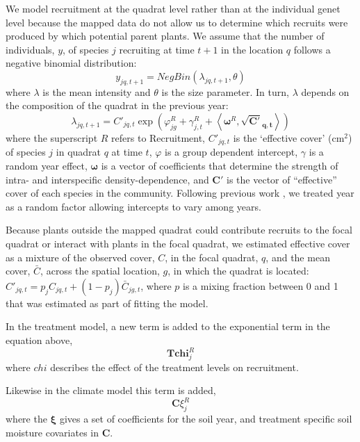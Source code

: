 \documentclass[11pt]{article}
\begin{document}
\begin{doublespacing}
We model recruitment at the quadrat level rather than at the individual genet level because the mapped data do not allow us to determine which recruits were produced by which potential parent plants. We assume that the number of individuals, $y$, of species $j$ recruiting at time $t+1$ in the location $q$ follows a negative binomial distribution:
\begin{equation}
y_{jq,t+1}= NegBin(\lambda_{jq,t+1},\theta) 	   
\label{eqn:recrDataModel}
\end{equation}
where $\lambda$ is the mean intensity and $\theta$ is the size parameter. In turn, $\lambda$ depends on the composition of the quadrat in the previous year:
\begin{equation}
\lambda_{jq,t+1} = C'_{jq,t} \exp{\left(\varphi_{jg}^R + \gamma_{j,t}^R + 
\left \langle \boldsymbol{\omega}^R , \boldsymbol{\sqrt{C'}_{q,t}} \right \rangle \right) }
\label{eqn:recrProcessModel}
\end{equation}
where the superscript $R$ refers to Recruitment, $C'_{jq,t}$ is the `effective cover' (cm$^2$) of species $j$ in quadrat $q$ at time $t$, $\varphi$ is a group dependent intercept, $\gamma$ is a random year effect, $\boldsymbol{\omega}$ is a vector of coefficients that determine the strength of intra- and interspecific density-dependence, and $\boldsymbol{C'}$ is the vector of ``effective'' cover of each species in the community. Following previous work \citep{adler_coexistence_2010}, we treated year as a random factor allowing intercepts to vary among years. 
   
Because plants outside the mapped quadrat could contribute recruits to the focal quadrat or interact with plants in the focal quadrat, we estimated effective cover as a mixture of the observed cover, $C$, in the focal quadrat, $q$, and the mean cover, $\bar{C}$, across the spatial location, $g$, in which the quadrat is located: $C'_{jq,t}=p_j C_{jq,t}+(1-p_j) \bar{C}_{jg,t}$, where $p$ is a mixing fraction between 0 and 1 that was estimated as part of fitting the model.

In the treatment model, a new term is added to the exponential term in the equation above, 
\begin{equation}
 \boldsymbol{T}\boldsymbol{chi}_{j}^R
\end{equation}
where $chi$ describes the effect of the treatment levels on recruitment.

Likewise in the climate model this term is added,
\begin{equation}
\boldsymbol{C}\xi_{j}^R 
\label{eqn:recC}
\end{equation}
where the $\boldsymbol{\xi}$ gives a set of coefficients for the soil year, and treatment specific soil moisture covariates in $\boldsymbol{C}$.


\end{doublespacing}
\end{document}
